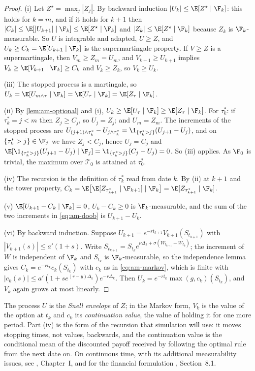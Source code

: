 \begin{proof}
(i) Let $Z^\star=\max_j|Z_j|$. By backward induction $|U_k|\le\E[Z^\star\mid\F_k]$: this
holds for $k=m$, and if it holds for $k+1$ then $|C_k|\le\E[|U_{k+1}|\mid\F_k]\le
\E[Z^\star\mid\F_k]$ and $|Z_k|\le\E[Z^\star\mid\F_k]$ because $Z_k$ is $\F_k$-measurable.
So $U$ is integrable and adapted, $U\ge Z$, and $U_k\ge C_k=\E[U_{k+1}\mid\F_k]$ is the
supermartingale property. If $V\ge Z$ is a supermartingale, then $V_m\ge Z_m=U_m$, and
$V_{k+1}\ge U_{k+1}$ implies $V_k\ge\E[V_{k+1}\mid\F_k]\ge C_k$ and $V_k\ge Z_k$, so
$V_k\ge U_k$.

(iii) The stopped process is a martingale, so
$U_k=\E[U_{m\wedge\tau}\mid\F_k]=\E[U_\tau\mid\F_k]=\E[Z_\tau\mid\F_k]$.

(ii) By \cref{lem:am-optional} and (i), $U_k\ge\E[U_\tau\mid\F_k]\ge\E[Z_\tau\mid\F_k]$.
For $\tau^*_k$: if $\tau^*_k=j<m$ then $Z_j\ge C_j$, so $U_j=Z_j$; and $U_m=Z_m$. The
increments of the stopped process are
$U_{(j+1)\wedge\tau^*_k}-U_{j\wedge\tau^*_k}=\1_{\{\tau^*_k>j\}}(U_{j+1}-U_j)$, and on
$\{\tau^*_k>j\}\in\F_j$ we have $Z_j<C_j$, hence $U_j=C_j$ and
$\E[\1_{\{\tau^*_k>j\}}(U_{j+1}-U_j)\mid\F_j]=\1_{\{\tau^*_k>j\}}(C_j-U_j)=0$. So (iii)
applies. As $\F_0$ is trivial, the maximum over $\mathcal T_0$ is attained at $\tau^*_0$.

(iv) The recursion is the definition of $\tau^*_k$ read from date $k$. By (ii) at $k+1$
and the tower property, $C_k=\E\big[\E[Z_{\tau^*_{k+1}}\mid\F_{k+1}]\mid\F_k\big]=\E[Z_{\tau^*_{k+1}}\mid\F_k]$.

(v) $\E[U_{k+1}-C_k\mid\F_k]=0$, $U_k-C_k\ge0$ is $\F_k$-measurable, and the sum of the two
increments in \eqref{eq:am-doob} is $U_{k+1}-U_k$.

(vi) By backward induction. Suppose $U_{k+1}=e^{-rt_{k+1}}V_{k+1}(S_{t_{k+1}})$ with
$|V_{k+1}(s)|\le a'(1+s)$. Write $S_{t_{k+1}}=S_{t_k}e^{\nu\Delta_k+\sigma(W_{t_{k+1}}-W_{t_k})}$;
the increment of $W$ is independent of $\F_k$ and $S_{t_k}$ is $\F_k$-measurable, so the
independence lemma \citep[Lemma~2.3.4]{shreve2} gives $C_k=e^{-rt_k}c_k(S_{t_k})$ with
$c_k$ as in \eqref{eq:am-markov}, which is finite with $|c_k(s)|\le
a'(1+se^{(r-y)\Delta_k})e^{-r\Delta_k}$. Then $U_k=e^{-rt_k}\max(g,c_k)(S_{t_k})$, and
$V_k$ again grows at most linearly.
\end{proof}

The process $U$ is the \emph{Snell envelope} of $Z$; in the Markov form, $V_k$ is the value
of the option at $t_k$ and $c_k$ its \emph{continuation value}, the value of holding it for
one more period. Part (iv) is the form of the recursion that simulation will use: it moves
stopping times, not values, backwards, and the continuation value is the conditional mean
of the discounted payoff received by following the optimal rule from the next date on. On
continuous time, with its additional measurability issues, see \textcite{peskir-shiryaev},
Chapter~I, and for the financial formulation \textcite{glasserman-mc}, Section~8.1.

